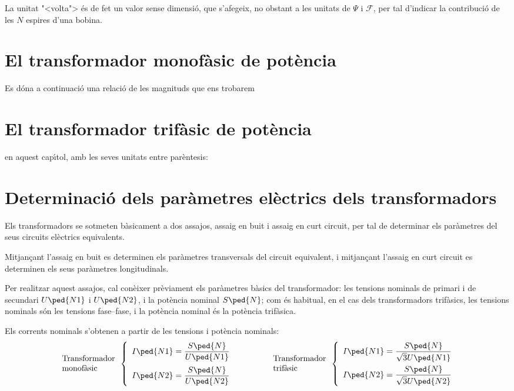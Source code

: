 La unitat {"<}volta{">} \'{e}s de fet un valor sense dimensi\'{o}, que s'afegeix,
no obstant a les unitats de $\Psi$ i $\mathscr{F}$, per tal
d'indicar la contribuci\'{o} de les $N$ espires d'una bobina.


\section{El transformador monof\`{a}sic de pot\`{e}ncia}

Es d\'{o}na a continuaci\'{o} una relaci\'{o} de les magnituds que ens trobarem

\section{El transformador trif\`{a}sic de pot\`{e}ncia}

en aquest cap\'{\i}tol, amb les seves unitats entre par\`{e}ntesis:

\section{Determinaci\'{o} dels par\`{a}metres el\`{e}ctrics dels transformadors}

Els transformadors se sotmeten b\`{a}sicament a dos assajos, assaig en
buit i assaig en curt circuit, per tal de determinar els par\`{a}metres
del seus circuits el\`{e}ctrics equivalents.

Mitjan\c{c}ant l'assaig en buit es determinen els par\`{a}metres
transversals del circuit equivalent, i mitjan\c{c}ant l'assaig en curt
circuit es determinen els seus par\`{a}metres longitudinals.

Per realitzar aquest assajos, cal con\`{e}ixer pr\`{e}viament els par\`{a}metres
b\`{a}sics del transformador: les tensions nominals de primari i de
secundari $U\ped{N1}$ i $U\ped{N2}$, i la pot\`{e}ncia nominal
$S\ped{N}$; com \'{e}s habitual, en el cas dels transformadors
trif\`{a}sics, les tensions nominals s\'{o}n les tensions fase--fase, i la
pot\`{e}ncia nominal \'{e}s la pot\`{e}ncia trif\`{a}sica.

Els corrents nominals s'obtenen a partir de les tensions i pot\`{e}ncia
nominals:
\begin{equation}
\begin{array}{l}\text{Transformador}\\
\text{monof\`{a}sic}
\end{array} \left\{
\begin{array}{l}
   I\ped{N1} = \dfrac{S\ped{N}}{U\ped{N1}} \\[2.7ex]
   I\ped{N2} = \dfrac{S\ped{N}}{U\ped{N2}}
\end{array}
\right. \qquad\qquad
\begin{array}{l}\text{Transformador}\\
\text{trif\`{a}sic}
\end{array} \left\{
\begin{array}{l}
   I\ped{N1} = \dfrac{S\ped{N}}{\sqrt{3}U\ped{N1}} \\[2.5ex]
   I\ped{N2} = \dfrac{S\ped{N}}{\sqrt{3}U\ped{N2}}
\end{array}
\right.
\end{equation}

